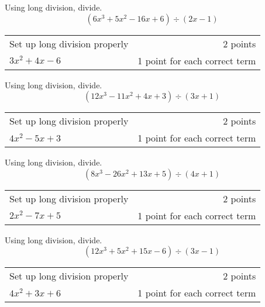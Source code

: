 {
	Using long division, divide.  $$(6x^3 +5x^2 -16x + 6) \div (2x-1)$$
}
{
	\noindent\begin{tabular}{l r}
	Set up long division properly &   2 points \\
	$3x^2+4x-6$ & 1 point for each correct term
	\end{tabular}
}

{
	Using long division, divide.  $$(12x^3 -11x^2 +4x + 3) \div (3x+1)$$
}
{
	\begin{tabular}{l r}
	Set up long division properly &   2 points \\
	$4x^2-5x+3$ & 1 point for each correct term
	\end{tabular}
}

{
	Using long division, divide.  $$(8x^3 -26x^2 +13x + 5)\div (4x+1)$$
}
{
	\begin{tabular}{l r}
	Set up long division properly &   2 points \\
	$2x^2-7x+5$ & 1 point for each correct term
	\end{tabular}
}

{
	Using long division, divide.  $$(12x^3 +5x^2 +15x -6)  \div (3x-1)$$
}
{
	\noindent\begin{tabular}{lr}
	Set up long division properly &   2 points \\
	$4x^2+3x+6$ & 1 point for each correct term
	\end{tabular}
}

